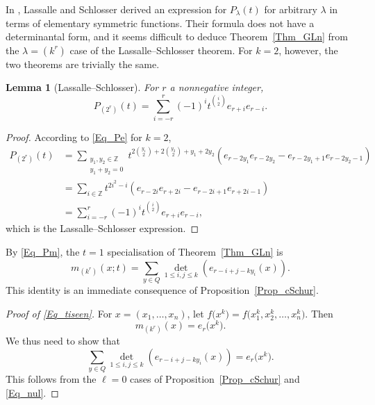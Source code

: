 \documentclass[pdftex]{sigma}
\numberwithin{equation}{section}
\newtheorem{Lemma}[Theorem]{Lemma}
\renewcommand{\leq}{\leqslant}
\newcommand{\la}{\lambda}
\begin{document}
In \cite[Theorem 7.2]{LS06}, Lassalle and Schlosser derived an expression
for $P_{\la}(t)$ for arbitrary $\la$ in terms of elementary symmetric
functions.
Their formula does not have a determinantal form, and it seems difficult
to deduce Theorem~\ref{Thm_GLn} from the $\la=(k^r)$ case of the
Lassalle--Schlosser theorem. For $k=2$, however, the two theorems
are trivially the same.

\begin{Lemma}[Lassalle--Schlosser]
For $r$ a nonnegative integer,
\[
P_{(2^r)}(t)
=\sum_{i=-r}^r (-1)^i t^{\binom{i}{2}} e_{r+i} e_{r-i}.
\]
\end{Lemma}

\begin{proof}
According to \eqref{Eq_Pe} for $k=2$,
\begin{align*}
P_{(2^r)}(t)
&=\sum_{\substack{y_1,y_2\in\mathbb{Z} \\[1pt] y_1+y_2=0}}
t^{2\binom{y_1}{2}+2\binom{y_2}{2}+y_1+2y_2}
 ( e_{r-2y_1} e_{r-2y_2}-e_{r-2y_1+1} e_{r-2y_2-1} ) \\
&=\sum_{i\in\mathbb{Z}}
t^{2i^2-i} ( e_{r-2i} e_{r+2i}-e_{r-2i+1} e_{r+2i-1} ) \\
&=\sum_{i=-r}^r(-1)^i t^{\binom{i}{2}} e_{r+i} e_{r-i},
\end{align*}
which is the Lassalle--Schlosser expression.
\end{proof}

By \eqref{Eq_Pm}, the $t=1$ specialisation of Theorem~\ref{Thm_GLn} is
\begin{equation}\label{Eq_tiseen}
m_{(k^r)}(x;t)=
\sum_{y\in Q} \det_{1\leq i,j\leq k} (e_{r-i+j-ky_i}(x) ).
\end{equation}
This identity is an immediate consequence of Proposition~\ref{Prop_cSchur}.

\begin{proof}[Proof of \eqref{Eq_tiseen}]
For $x=(x_1,\dots,x_n)$, let $f\bigl(x^k\bigr)=f\bigl(x_1^k,x_2^k,\dots,x_n^k\bigr)$.
Then
\[
m_{(k^r)}(x)=e_r\bigl(x^k\bigr).
\]
We thus need to show that
\[
\sum_{y\in Q} \det_{1\leq i,j\leq k} (e_{r-i+j-ky_i}(x) )
=e_r\bigl(x^k\bigr).
\]
This follows from the $\ell=0$ cases of Proposition~\ref{Prop_cSchur}
and \eqref{Eq_nul}.
\end{proof}
\end{document}
